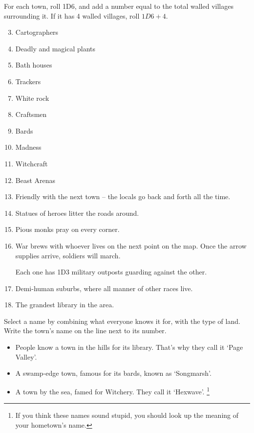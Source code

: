 \begin{multicols}{2}
For each town, roll 1D6, and add a number equal to the total walled villages surrounding it.
If it has 4 walled villages, roll $1D6+4$.

\begin{multicols}{2}

\begin{enumerate}
\setcounter{enumi}{2}
\item
  Cartographers
\item
  Deadly and magical plants
\item
  Bath houses
\item
  Trackers
\item
  White rock
\item
  Craftsmen
\item
  Bards
\item
  Madness
\item
  Witchcraft
\item
  Beast Arenas
\item
  Friendly with the next town -- the locals go back and forth all the
  time.
\item
  Statues of heroes litter the roads around.
\item
  Pious monks pray on every corner.
\item
  War brews with whoever lives on the next point on the map. Once the
  arrow supplies arrive, soldiers will march.

  Each one has 1D3 military outposts guarding against the other.
\item
  Demi-human suburbs, where all manner of other races live.
\item
  The grandest library in the area.
\end{enumerate}

\end{multicols}


Select a name by combining what everyone knows it for, with the type of
land.
Write the town's name on the line next to its number.

\begin{itemize}
\item
  People know a town in the hills for its library. That's why they call
  it `Page Valley'.
\item
  A swamp-edge town, famous for its bards, known as `Songmarsh'.
\item
  A town by the sea, famed for Witchery.
  They call it `Hexwave'.%
  \footnote{If you think these names sound stupid, you should look up the meaning of your hometown's name.}
\end{itemize}


\end{multicols}
